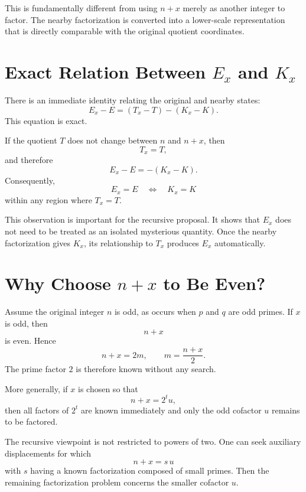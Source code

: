 \documentclass[11pt,a4paper]{article}
\begin{document}
This is fundamentally different from using $n+x$ merely as another integer
to factor. The nearby factorization is converted into a lower-scale
representation that is directly comparable with the original quotient
coordinates.

\section{Exact Relation Between $E_x$ and $K_x$}

There is an immediate identity relating the original and nearby states:
\begin{equation}
\label{eq:exact-difference}
    E_x-E
    =
    \left(T_x-T\right)-\left(K_x-K\right).
\end{equation}
This equation is exact.

If the quotient $
T$ does not change between $n$ and $n+x$, then
\[
    T_x=T,
\]
and therefore
\begin{equation}
\label{eq:constant-T}
    E_x-E=-(K_x-K).
\end{equation}
Consequently,
\[
    E_x=E
    \quad\Longleftrightarrow\quad
    K_x=K
\]
within any region where $T_x=T$.

This observation is important for the recursive proposal. It shows that
$E_x$ does not need to be treated as an isolated mysterious quantity.
Once the nearby factorization gives $K_x$, its relationship to $T_x$
produces $E_x$ automatically.

\section{Why Choose $n+x$ to Be Even?}

Assume the original integer $n$ is odd, as occurs when $p$ and $q$ are odd
primes. If $x$ is odd, then
\[
    n+x
\]
is even. Hence
\begin{equation}
\label{eq:even-neighbor}
    n+x=2m,
    \qquad
    m=\frac{n+x}{2}.
\end{equation}
The prime factor $2$ is therefore known without any search.

More generally, if $x$ is chosen so that
\[
    n+x=2^t u,
\]
then all factors of $2^t$ are known immediately and only the odd cofactor
$u$ remains to be factored.

The recursive viewpoint is not restricted to powers of two. One can seek
auxiliary displacements for which
\[
    n+x=s\,u
\]
with $s$ having a known factorization composed of small primes. Then the
remaining factorization problem concerns the smaller cofactor $u$.
\end{document}
